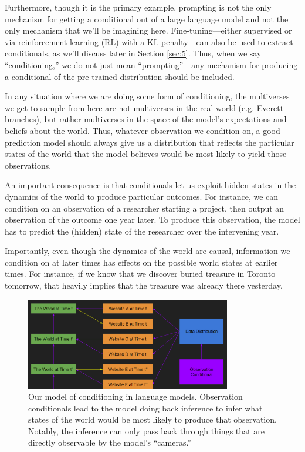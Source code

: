 \documentclass[
  onecolumn,
  nonatbib,
]{miri-tech-article}
\begin{document}
Furthermore, though it is the primary example, prompting is not the only mechanism for getting a conditional out of a large language model and not the only mechanism that we'll be imagining here. Fine-tuning---either supervised or via reinforcement learning (RL) with a KL penalty\cite{kl_penalty}---can also be used to extract conditionals, as we'll discuss later in Section \ref{sec:5}. Thus, when we say ``conditioning,'' we do not just mean ``prompting''---any mechanism for producing a conditional of the pre-trained distribution should be included.

In any situation where we are doing some form of conditioning, the multiverses we get to sample from here are not multiverses in the real world (e.g. Everett branches\cite{multiple_worlds}), but rather multiverses in the space of the model's expectations and beliefs about the world. Thus, whatever observation we condition on, a good prediction model should always give us a distribution that reflects the particular states of the world that the model believes would be most likely to yield those observations.

An important consequence is that conditionals let us exploit hidden states in the dynamics of the world to produce particular outcomes. For instance, we can condition on an observation of a researcher starting a project, then output an observation of the outcome one year later. To produce this observation, the model has to predict the (hidden) state of the researcher over the intervening year.

Importantly, even though the dynamics of the world are causal, information we condition on at later times has effects on the possible world states at earlier times. For instance, if we know that we discover buried treasure in Toronto tomorrow, that heavily implies that the treasure was already there yesterday.

\begin{figure}[h!]
  \centering
  \includegraphics[width=0.8\textwidth]{FHhZzMg.png}
  \caption{Our model of conditioning in language models. Observation conditionals lead to the model doing back inference to infer what states of the world would be most likely to produce that observation. Notably, the inference can only pass back through things that are directly observable by the model's ``cameras.''}
\end{figure}
\end{document}
